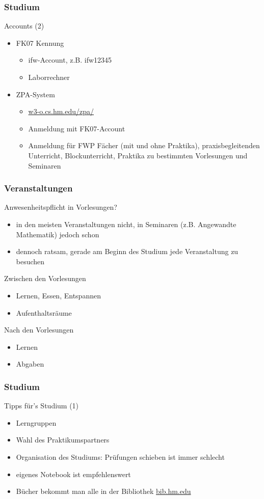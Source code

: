 \documentclass{beamer}
\begin{document}
	\begin{frame}
		\frametitle{Studium}
		Accounts (2)
		\begin{itemize}
			\item FK07 Kennung
			\begin{itemize}
				\item ifw-Account, z.B. ifw12345
				\item Laborrechner
			\end{itemize}
			\pause
			\item ZPA-System
			\begin{itemize}
				\item \url{w3-o.cs.hm.edu/zpa/}
				\item Anmeldung mit FK07-Account
				\item Anmeldung  für FWP Fächer (mit und ohne Praktika),
				praxisbegleitenden Unterricht,
				Blockunterricht,
				Praktika zu bestimmten Vorlesungen und
				Seminaren
			\end{itemize}
		\end{itemize}
	\end{frame}
	
	\begin{frame}
		\frametitle{Veranstaltungen}
		Anwesenheitspflicht in Vorlesungen?
		\begin{itemize}
			\item in den meisten Veranstaltungen nicht, in Seminaren (z.B. Angewandte Mathematik) jedoch schon
			\item dennoch ratsam, gerade am Beginn des Studium jede Veranstaltung zu besuchen
		\end{itemize}
		\bigskip
		\pause
		Zwischen den Vorlesungen
		\begin{itemize}
			\item Lernen, Essen, Entspannen
			\item Aufenthaltsräume
		\end{itemize}
		\bigskip
		\pause
		Nach den Vorlesungen
		\begin{itemize}
			\item Lernen
			\item Abgaben
		\end{itemize}
		
	\end{frame}
	
	\begin{frame}
		\frametitle{Studium}
		Tipps für's Studium (1)
		\begin{itemize}
			\item Lerngruppen
			\pause
			\item Wahl des Praktikumspartners
			\pause
			\item Organisation des Studiums: Prüfungen schieben ist immer schlecht
			\pause
			\item eigenes Notebook ist empfehlenswert
			\pause
			\item Bücher bekommt man alle in der Bibliothek \url{bib.hm.edu}
		\end{itemize}
	\end{frame}
	
\end{document}
